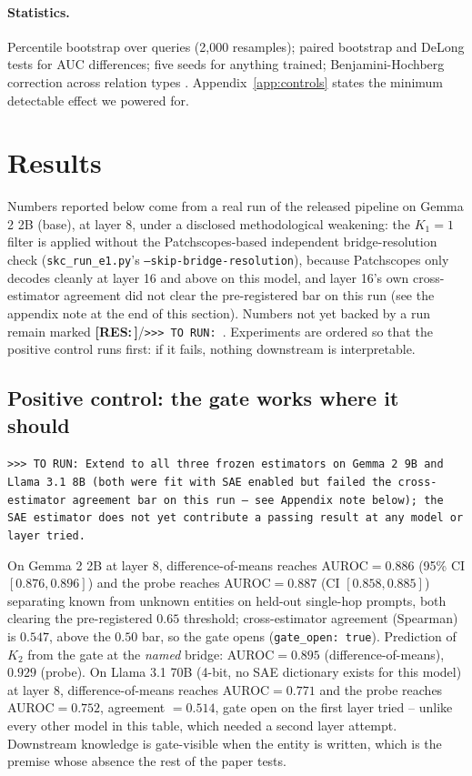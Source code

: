 \documentclass{article}
\newcommand{\RES}[1]{{\color{red}\textbf{[RES:\,#1]}}}
\newcommand{\TORUN}[1]{{\color{blue}\texttt{>{}>{}> TO RUN: #1}}}
\begin{document}
\paragraph{Statistics.} Percentile bootstrap over queries (2{,}000 resamples); paired bootstrap and
DeLong tests \citep{delong1988comparing} for AUC differences; five seeds for anything trained;
Benjamini-Hochberg correction across relation types \citep{benjamini1995controlling}. Appendix~\ref{app:controls} states the minimum detectable effect we powered for.

\section{Results}
\label{sec:results}

Numbers reported below come from a real run of the released pipeline on Gemma 2 2B (base), at layer
8, under a disclosed methodological weakening: the $K_1{=}1$ filter is applied without the
Patchscopes-based independent bridge-resolution check (\texttt{skc\_run\_e1.py}'s
\texttt{--skip-bridge-resolution}), because Patchscopes only decodes cleanly at layer 16 and above on
this model, and layer 16's own cross-estimator agreement did not clear the pre-registered bar on this
run (see the appendix note at the end of this section). Numbers not yet backed by a run remain marked
\RES{}/\TORUN{}. Experiments are ordered so that the positive control runs first: if it fails, nothing
downstream is interpretable.

\subsection{Positive control: the gate works where it should}

\TORUN{Extend to all three frozen estimators on Gemma 2 9B and Llama 3.1 8B (both were fit with SAE
enabled but failed the cross-estimator agreement bar on this run -- see Appendix note below); the SAE
estimator does not yet contribute a passing result at any model or layer tried.}

On Gemma 2 2B at layer 8, difference-of-means reaches AUROC$=0.886$ (95\% CI $[0.876,0.896]$) and the
probe reaches AUROC$=0.887$ (CI $[0.858,0.885]$) separating known from unknown entities on held-out
single-hop prompts, both clearing the pre-registered $0.65$ threshold; cross-estimator agreement
(Spearman) is $0.547$, above the $0.50$ bar, so the gate opens (\texttt{gate\_open: true}). Prediction of $K_2$ from the gate at
the \emph{named} bridge: AUROC$=0.895$ (difference-of-means), $0.929$ (probe). On Llama 3.1 70B
(4-bit, no SAE dictionary exists for this model) at layer 8, difference-of-means reaches
AUROC$=0.771$ and the probe reaches AUROC$=0.752$, agreement $=0.514$, gate open on the first
layer tried -- unlike every other model in this table, which needed a second layer attempt.
Downstream knowledge is gate-visible when the entity is
written, which is the premise whose absence the rest of the paper tests.
\end{document}

